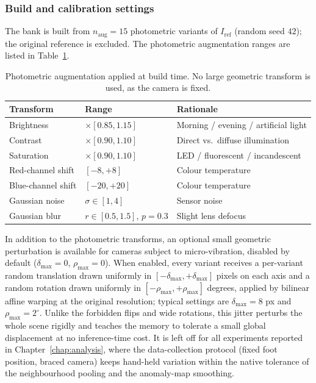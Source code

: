 \subsubsection{Build and calibration settings}

The bank is built from $n_{\mathrm{aug}} = 15$ photometric variants of
$I_{\mathrm{ref}}$ (random seed $42$); the original reference is excluded. The
photometric augmentation ranges are listed in Table~\ref{tab:p3-photo}.

\begin{table}[h]
  \centering
  \begin{tabular}{lll}
    \hline
    Transform & Range & Rationale \\
    \hline
    Brightness & $\times[0.85, 1.15]$ & Morning / evening / artificial light \\
    Contrast & $\times[0.90, 1.10]$ & Direct vs.\ diffuse illumination \\
    Saturation & $\times[0.90, 1.10]$ & LED / fluorescent / incandescent \\
    Red-channel shift & $[-8, +8]$ & Colour temperature \\
    Blue-channel shift & $[-20, +20]$ & Colour temperature \\
    Gaussian noise & $\sigma \in [1, 4]$ & Sensor noise \\
    Gaussian blur & $r \in [0.5, 1.5]$, $p=0.3$ & Slight lens defocus \\
    \hline
  \end{tabular}
  \caption{Photometric augmentation applied at build time. No large geometric
  transform is used, as the camera is fixed.}
  \label{tab:p3-photo}
\end{table}

In addition to the photometric transforms, an optional small geometric
perturbation is available for cameras subject to micro-vibration, disabled by
default ($\delta_{\max} = 0$, $\rho_{\max} = 0$). When enabled, every variant
receives a per-variant random translation drawn uniformly in
$[-\delta_{\max}, +\delta_{\max}]$ pixels on each axis and a random rotation drawn
uniformly in $[-\rho_{\max}, +\rho_{\max}]$ degrees, applied by bilinear affine
warping at the original resolution; typical settings are $\delta_{\max} = 8$ px
and $\rho_{\max} = 2^{\circ}$. Unlike the forbidden flips and wide rotations, this
jitter perturbs the whole scene rigidly and teaches the memory to tolerate a small
global displacement at no inference-time cost. It is left off for all experiments
reported in Chapter~\ref{chap:analysis}, where the data-collection protocol (fixed
foot position, braced camera) keeps hand-held variation within the native
tolerance of the neighbourhood pooling and the anomaly-map smoothing.

